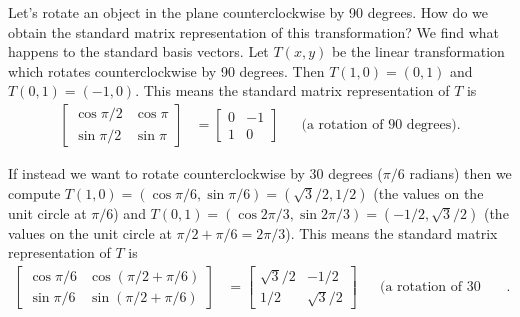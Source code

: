 \begin{example}
Let's rotate an object in the plane counterclockwise by 90 degrees. 
How do we obtain the standard matrix representation of this transformation? 
We find what happens to the standard basis vectors. 
Let $T(x,y)$ be the linear transformation which rotates counterclockwise by 90 degrees.  Then $T(1,0)=(0,1)$ and $T(0,1)=(-1,0)$.  
This means the standard matrix representation of $T$ is 
\begin{align*}
\begin{bmatrix}
\cos \pi/2&\cos\pi\\
\sin\pi/2&\sin\pi
\end{bmatrix}&=\begin{bmatrix}0&-1\\1&0\end{bmatrix} && \text{(a rotation of 90 degrees)}.
\end{align*}

If instead we want to rotate counterclockwise by 30 degrees ($\pi/6$ radians)  then we compute 
$T(1,0) = (\cos \pi/6, \sin \pi/6) = (\sqrt3/2,1/2)$ (the values on the unit circle at $\pi/6$)  and 
$T(0,1) = (\cos 2\pi/3, \sin 2\pi/3) = (-1/2,\sqrt3/2) $ (the values on the unit circle at $\pi/2+\pi/6 = 2\pi/3$). 
This means the standard matrix representation of $T$ is 
\begin{align*}
\begin{bmatrix}
\cos \pi/6&\cos(\pi/2+\pi/6)\\
\sin\pi/6&\sin(\pi/2+\pi/6)
\end{bmatrix}
&=\begin{bmatrix}\sqrt3/2&-1/2\\1/2&\sqrt3/2\end{bmatrix}  &&\text{(a rotation of 30 degrees)}.
\end{align*}

\end{example}

